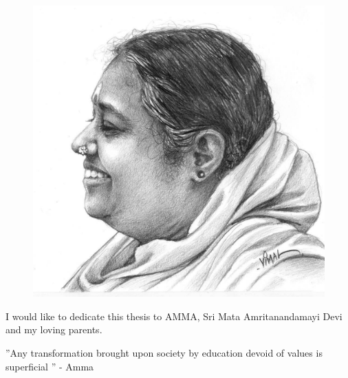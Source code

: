 
\begin{dedication} %
\begin{figure}[t] %
  \begin{center}
    \includegraphics[scale=0.24]{figs/amma.png}
  \end{center}
\end{figure} 
I would like to dedicate this thesis to AMMA, Sri Mata Amritanandamayi Devi and my loving parents.

''Any transformation brought upon society by education devoid of values is superficial '' - Amma

\end{dedication}


